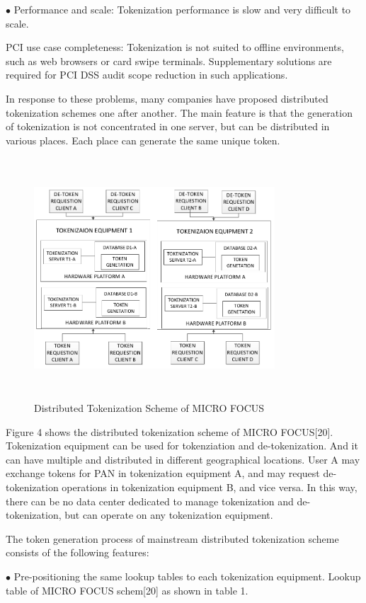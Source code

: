 \documentclass[journal]{IEEEtran}
\begin{document}
$ \bullet $ Performance and scale: Tokenization performance is slow and very difficult to scale.

 PCI use case completeness: Tokenization is not suited to offline environments, such as web browsers or card swipe terminals. Supplementary solutions are required for PCI DSS audit scope reduction in such applications.

In response to these problems, many companies have proposed distributed tokenization schemes one after another. The main feature is that the generation of tokenization is not concentrated in one server, but can be distributed in various places. Each place can generate the same unique token.


\begin{figure}[htbp]
\centerline{\includegraphics[width=9cm,height=9cm]{dis_token.png}}
\caption{Distributed Tokenization Scheme of MICRO FOCUS}
\label{fig}
\end{figure}

Figure 4 shows the distributed tokenization scheme of MICRO FOCUS[20]. Tokenization equipment can be used for tokenziation and de-tokenization. And it can have multiple and distributed in different geographical locations. User A may exchange tokens for PAN in tokenization equipment A, and may request de-tokenization operations in tokenization equipment B, and vice versa. In this way, there can be no data center dedicated to manage tokenization and de-tokenization, but can operate on any tokenization equipment.

The token generation process of mainstream distributed tokenization scheme consists of the following features:

$ \bullet $ Pre-positioning the same lookup tables to each tokenization equipment. Lookup table of MICRO FOCUS schem[20] as shown in table 1.
\end{document}
